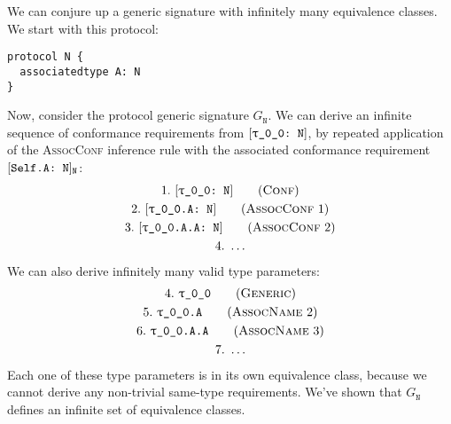 \documentclass[../generics]{subfiles}
\begin{document}
\begin{example}\label{protocol n example}
We can conjure up a generic signature with infinitely many equivalence classes. We start with this protocol:
\begin{Verbatim}
protocol N {
  associatedtype A: N
}
\end{Verbatim}
Now, consider the protocol generic signature $G_\texttt{N}$. We can derive an infinite sequence of conformance requirements from $\ConfReq{\rT}{N}$, by repeated application of the \textsc{AssocConf} inference rule with the associated conformance requirement $[\texttt{Self.A:~N}]_{\texttt{N}}$:
\begin{gather*}
\ConfStep{\rT}{N}{1}\\
\AssocConfStep{1}{\rT.A}{N}{2}\\
\AssocConfStep{2}{\rT.A.A}{N}{3}\\
4.\ \ldots
\end{gather*}
We can also derive infinitely many valid type parameters:
\begin{gather*}
\GenericStep{\rT}{4}\\
\AssocNameStep{2}{\rT.A}{5}\\
\AssocNameStep{3}{\rT.A.A}{6}\\
7.\ \ldots
\end{gather*}
Each one of these type parameters is in its own equivalence class, because we cannot derive any non-trivial same-type requirements. We've shown that $G_\texttt{N}$ defines an infinite set of equivalence classes.
\end{example}
\end{document}
